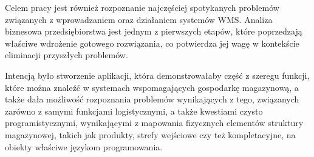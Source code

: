 	Celem pracy jest również rozpoznanie najczęściej spotykanych problemów związanych
	z wprowadzaniem oraz działaniem systemów WMS. Analiza biznesowa przedsiębiorstwa
	jest jednym z pierwszych etapów, które poprzedzają właściwe wdrożenie
	gotowego rozwiązania, co potwierdza jej wagę w kontekście eliminacji przyszłych
	problemów.
	
	Intencją było stworzenie aplikacji, która demonstrowałaby część z szeregu funkcji,
	które można znaleźć w systemach wspomagających gospodarkę magazynową, a także dała
	możliwość rozpoznania problemów wynikających z tego, związanych zarówno z samymi
	funkcjami logistycznymi, a także kwestiami czysto programistycznymi, wynikającymi
	z mapowania fizycznych elementów struktury magazynowej, 
	takich jak produkty, strefy wejściowe czy też kompletacyjne,
	na obiekty właściwe językom programowania.
	
